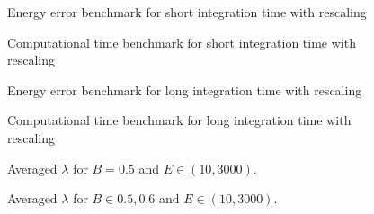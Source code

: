 \documentclass{beamer}
\begin{document}

\begin{frame}
	\begin{figure}
		
		\caption{Energy error benchmark for short integration time with rescaling}
	\end{figure}
\end{frame}


\begin{frame}
	\begin{figure}
		
		\caption{Computational time benchmark for short integration time with rescaling}
	\end{figure}
\end{frame}


\begin{frame}
	\begin{figure}
		
		\caption{Energy error benchmark for long integration time with rescaling}
	\end{figure}
\end{frame}


\begin{frame}
	\begin{figure}
		
		\caption{Computational time benchmark for long integration time with rescaling}
	\end{figure}
\end{frame}


\begin{frame}
	\begin{figure}
		
		\caption{Averaged \(\lambda\) for \(B=0.5\) and \(E \in (10, 3000)\).}
	\end{figure}
\end{frame}


\begin{frame}
	\begin{figure}
		
		\caption{Averaged \(\lambda\) for \(B \in {0.5,0.6}\) and \(E \in (10, 3000)\).}
	\end{figure}
\end{frame}
\end{document}
